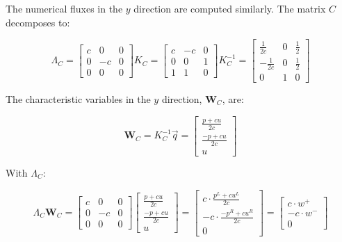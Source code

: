 The numerical fluxes in the $y$ direction are computed similarly. The matrix $C$ decomposes to:

\begin{equation}
	\Lambda_C = \begin{bmatrix}
        c & 0 & 0 \\ 
        0 & -c & 0 \\ 
        0 & 0 & 0
	\end{bmatrix}
	K_C = \begin{bmatrix}
        c & -c & 0 \\ 
        0 & 0 & 1 \\ 
        1 & 1 & 0 
	\end{bmatrix}
	K_C^{-1} = \begin{bmatrix}
        \frac{1}{2 c} & 0 & \frac{1}{2} \\ 
        -\frac{1}{2 c} & 0 & \frac{1}{2} \\ 
        0 & 1 & 0
	\end{bmatrix}
\end{equation}

The characteristic variables in the $y$ direction, $\mathbf{W}_C$, are:

\begin{equation}
	\mathbf{W}_C = K_C^{-1} \overrightarrow{q} = 
	\begin{bmatrix}
        \frac{p + c u}{2 c} \\ 
        \frac{-p + c u}{2 c} \\ 
        u
	\end{bmatrix}
\end{equation}

With $\Lambda_C$:

\begin{equation}
    \Lambda_C \mathbf{W}_C =  
    \begin{bmatrix}
        c & 0 & 0 \\ 
        0 & -c & 0 \\ 
        0 & 0 & 0
    \end{bmatrix}
    \begin{bmatrix}
        \frac{p + c u}{2 c} \\ 
        \frac{-p + c u}{2 c} \\ 
        u
    \end{bmatrix} = 
    \begin{bmatrix}
        c \cdot \frac{p^L + c u^L}{2 c} \\ 
        -c \cdot \frac{-p^R + c u^R}{2 c} \\ 
        0
    \end{bmatrix} = 
    \begin{bmatrix}
        c \cdot w^+ \\ 
        -c \cdot w^- \\ 
        0
    \end{bmatrix}
\end{equation}

